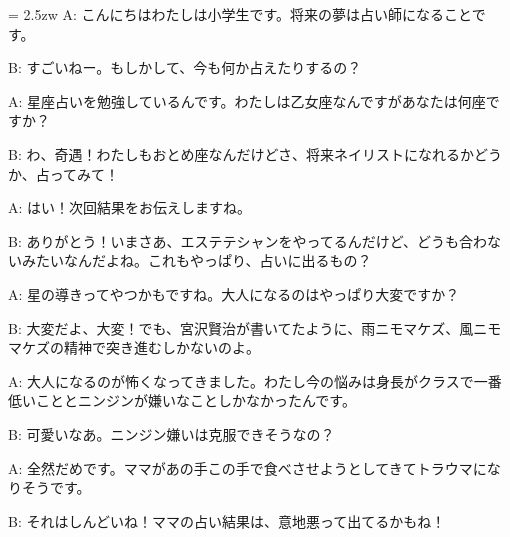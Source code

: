 \documentclass[11pt]{amsart}
\title{}
\author{}
\newenvironment{hangall}[1]{\hangindent = 2.5zw\everypar{\hangindent = 2.5zw}}{}
\begin{document}
\maketitle
\begin{hangall}{}%
A: こんにちはわたしは小学生です。将来の夢は占い師になることです。

B: すごいねー。もしかして、今も何か占えたりするの？

A: 星座占いを勉強しているんです。わたしは乙女座なんですがあなたは何座ですか？

B: わ、奇遇！わたしもおとめ座なんだけどさ、将来ネイリストになれるかどうか、占ってみて！

A: はい！次回結果をお伝えしますね。

B: ありがとう！いまさあ、エステテシャンをやってるんだけど、どうも合わないみたいなんだよね。これもやっぱり、占いに出るもの？

A: 星の導きってやつかもですね。大人になるのはやっぱり大変ですか？

B: 大変だよ、大変！でも、宮沢賢治が書いてたように、雨ニモマケズ、風ニモマケズの精神で突き進むしかないのよ。

A: 大人になるのが怖くなってきました。わたし今の悩みは身長がクラスで一番低いこととニンジンが嫌いなことしかなかったんです。

B: 可愛いなあ。ニンジン嫌いは克服できそうなの？

A: 全然だめです。ママがあの手この手で食べさせようとしてきてトラウマになりそうです。

B: それはしんどいね！ママの占い結果は、意地悪って出てるかもね！
\end{hangall}
\end{document}
